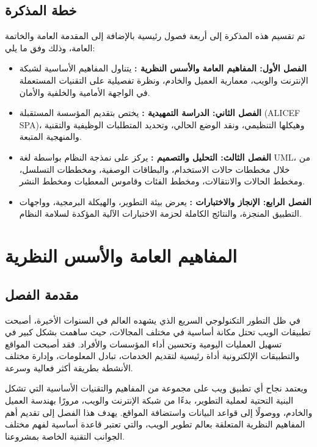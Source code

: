 \documentclass{bts-report-ar}
\begin{document}
\section*{خطة المذكرة}
تم تقسيم هذه المذكرة إلى أربعة فصول رئيسية بالإضافة إلى المقدمة العامة والخاتمة العامة، وذلك وفق ما يلي:
\begin{itemize}
  \item \textbf{الفصل الأول: المفاهيم العامة والأسس النظرية :} يتناول المفاهيم الأساسية لشبكة الإنترنت والويب، معمارية العميل والخادم، ونظرة تفصيلية على التقنيات المستعملة في الواجهة الأمامية والخلفية والأمان.
  \item \textbf{الفصل الثاني: الدراسة التمهيدية :} يختص بتقديم المؤسسة المستقبلة (ALICEF SPA)، وهيكلها التنظيمي، ونقد الوضع الحالي، وتحديد المتطلبات الوظيفية والتقنية والمنهجية المتبعة.
  \item \textbf{الفصل الثالث: التحليل والتصميم :} يركز على نمذجة النظام بواسطة لغة UML، من خلال مخططات حالات الاستخدام، والبطاقات الوصفية، ومخططات التسلسل، ومخطط الحالات والانتقالات، ومخطط الفئات وقاموس المعطيات ومخطط النشر.
  \item \textbf{الفصل الرابع: الإنجاز والاختبارات :} يعرض بيئة التطوير، والهيكلة البرمجية، وواجهات التطبيق المنجزة، والنتائج الكاملة لحزمة الاختبارات الآلية المؤكدة لسلامة النظام.
\end{itemize}


\chapter{المفاهيم العامة والأسس النظرية}

\section*{مقدمة الفصل}
في ظل التطور التكنولوجي السريع الذي يشهده العالم في السنوات الأخيرة، أصبحت تطبيقات الويب تحتل مكانة أساسية في مختلف المجالات، حيث ساهمت بشكل كبير في تسهيل العمليات اليومية وتحسين أداء المؤسسات والأفراد. فقد أصبحت المواقع والتطبيقات الإلكترونية أداة رئيسية لتقديم الخدمات، تبادل المعلومات، وإدارة مختلف الأنشطة بطريقة أكثر فعالية وسرعة.

ويعتمد نجاح أي تطبيق ويب على مجموعة من المفاهيم والتقنيات الأساسية التي تشكل البنية التحتية لعملية التطوير، بدءًا من شبكة الإنترنت والويب، مرورًا بهندسة العميل والخادم، ووصولًا إلى قواعد البيانات واستضافة المواقع. يهدف هذا الفصل إلى تقديم أهم المفاهيم النظرية المتعلقة بعالم تطوير الويب، والتي تعتبر قاعدة أساسية لفهم مختلف الجوانب التقنية الخاصة بمشروعنا.
\end{document}
